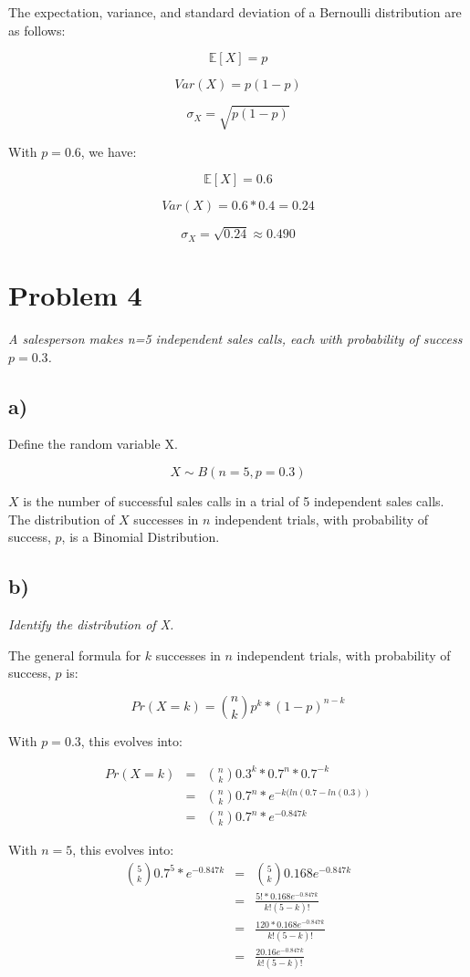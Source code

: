 \documentclass[11pt, oneside]{article}   	%
\begin{document}
The expectation, variance, and standard deviation of a Bernoulli distribution are as follows:

$$
\mathbb{E}[X] = p
$$

$$
Var(X) = p(1-p)
$$

$$
\sigma_X = \sqrt{p(1-p)}
$$

With $p=0.6$, we have:

$$
\mathbb{E}[X] = 0.6
$$

$$
Var(X) = 0.6*0.4 = 0.24
$$

$$
\sigma_X = \sqrt{0.24} \approx 0.490
$$



\section*{Problem 4}
\emph{A salesperson makes n=5 independent sales calls, each with probability of success $p = 0.3$.}

\subsection*{a)}
Define the random variable X.

$$
X \sim B(n=5, p = 0.3)
$$

$X$ is the number of successful sales calls in a trial of 5 independent sales calls. The distribution of $X$ successes in $n$ independent trials, with probability of success, $p$, is a Binomial Distribution.

\subsection*{b)}
\emph{Identify the distribution of X.}

The general formula for $k$ successes in $n$ independent trials, with probability of success, $p$ is:

$$
Pr(X = k) = \binom{n}{k} p^k*(1-p)^{n-k}
$$

With $p=0.3$, this evolves into:

\begin{eqnarray*}
Pr(X=k)&=&\binom{n}{k} 0.3^k*0.7^n*0.7^{-k}\\
&=& \binom{n}{k} 0.7^n*e^{-k(ln(0.7-ln(0.3))}\\
&=& \binom{n}{k} 0.7^n*e^{-0.847k}
\end{eqnarray*}

With $n=5$, this evolves into:
\begin{eqnarray*}
\binom{5}{k} 0.7^5*e^{-0.847k}
&=& \binom{5}{k} 0.168e^{-0.847k}\\
&=& \frac{5!*0.168e^{-0.847k}}{k!(5-k)!}\\
&=& \frac{120 * 0.168e^{-0.847k}}{k!(5-k)!}\\
&=& \frac{20.16e^{-0.847k}}{k!(5-k)!}
\end{eqnarray*}
\end{document}
